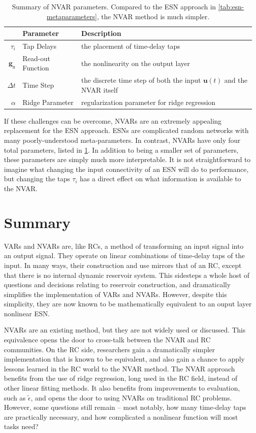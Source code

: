 \begin{table}
  \caption{Summary of NVAR parameters. Compared to the ESN approach in
    \cref{tab:esn-metaparameters}, the NVAR method is much simpler.}
  \begin{tabularx}{\linewidth}{rlX}
    & Parameter & Description \\
    \hline
    \rule{0pt}{4ex}
    $\tau_i$ & Tap Delays & the placement of time-delay taps \\
    \rule{0pt}{4ex}
    $\bm{g}_\text{n}$ & Read-out Function & the nonlinearity on the output layer \\
    \rule{0pt}{4ex}
    $\Delta t$ & Time Step & the discrete time step of both the input $\bm{u}(t)$ and the NVAR itself \\
    \rule{0pt}{4ex}
    $\alpha$ & Ridge Parameter & regularization parameter for ridge regression \\
  \end{tabularx}
  \label{tab:nvar-parameters}
\end{table}

If these challenges can be overcome, NVARs are an extremely appealing
replacement for the ESN approach. ESNs are complicated random networks
with many poorly-understood meta-parameters. In contrast, NVARs have
only four total parameters, listed in \cref{tab:nvar-parameters}.  In
addition to being a smaller set of parameters, these parameters are
simply much more interpretable. It is not straightforward to imagine
what changing the input connectivity of an ESN will do to performance,
but changing the taps $\tau_i$ has a direct effect on what information
is available to the NVAR.

\section{Summary}

VARs and NVARs are, like RCs, a method of transforming an input signal
into an output signal. They operate on linear combinations of
time-delay taps of the input. In many ways, their construction and use
mirrors that of an RC, except that there is no internal dynamic
reservoir system. This sidesteps a whole host of questions and
decisions relating to reservoir construction, and dramatically
simplifies the implementation of VARs and NVARs. However, despite this
simplicity, they are now known to be mathematically equivalent to an
ouput layer nonlinear ESN.

NVARs are an existing method, but they are not widely used or discussed. This equivalence opens the door
to cross-talk between the NVAR and RC communities. On the RC side,
researchers gain a dramatically simpler implementation that is known
to be equivalent, and also gain a chance to apply lessons learned in
the RC world to the NVAR method. The NVAR approach benefits from the
use of ridge regression, long used in the RC field, instead of other
linear fitting methods.  It also benefits from improvements to
evaluation, such as $\tilde{\epsilon}$, and opens the door to using
NVARs on traditional RC problems. However, some questions still
remain -- most notably, how many time-delay taps are practically
necessary, and how complicated a nonlinear function will most tasks
need?

